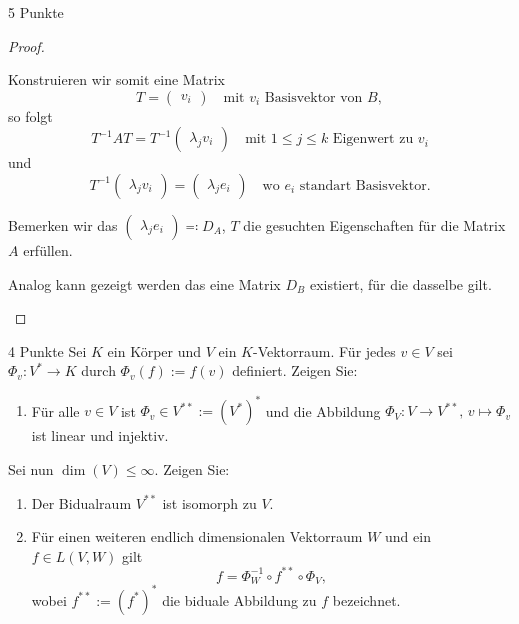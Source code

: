 \documentclass{problemset}
\begin{document}
\begin{problem}{5 Punkte}
\begin{proof}
\begin{enumerate}
              Konstruieren wir somit eine Matrix
              \begin{equation*}
                  T = \begin{pmatrix}
                      v_i
                  \end{pmatrix} \quad \text{mit } v_i \text{ Basisvektor von } B,
              \end{equation*} so folgt
              \begin{equation*}
                  T^{-1}AT = T^{-1} \begin{pmatrix}
                      \lambda_j v_i
                  \end{pmatrix} \quad \text{mit } 1 \le j \le k \text{ Eigenwert zu } v_i
              \end{equation*} und
              \begin{equation*}
                  T^{-1} \begin{pmatrix}
                      \lambda_j v_i
                  \end{pmatrix} = \begin{pmatrix}
                      \lambda_j e_i
                  \end{pmatrix} \quad \text{wo } e_i \text{ standart Basisvektor}.
              \end{equation*}

              Bemerken wir das \( \begin{pmatrix} \lambda_j e_i \end{pmatrix} \eqcolon D_A
              \), \(T\) die gesuchten Eigenschaften für die Matrix \(A\) erfüllen.

              Analog kann gezeigt werden das eine Matrix \(D_B\) existiert, für
              die dasselbe gilt.
    \end{enumerate}

\end{proof}
\end{problem}

\begin{problem}[Bidualraum]{4 Punkte}
Sei $K$ ein Körper und $V$ ein $K$-Vektorraum. Für jedes $v \in V$ sei $\Phi_v : V^* \to K$ durch $\Phi_v(f) := f(v)$ definiert. Zeigen Sie:
\begin{enumerate}
    \item Für alle $v \in V$ ist $\Phi_v \in V^{**} := (V^*)^*$ und die
          Abbildung $\Phi_V : V \to V^{**}, \, v \mapsto \Phi_v$ ist linear und
          injektiv.
\end{enumerate}
Sei nun $\dim(V) \leq \infty$. Zeigen Sie:
\begin{enumerate}[resume]
    \item Der Bidualraum $V^{**}$ ist isomorph zu $V$.
    \item Für einen weiteren endlich dimensionalen Vektorraum $W$ und ein $f
          \in L(V, W)$ gilt
          \[
              f = \Phi_W^{-1} \circ f^{**} \circ \Phi_V,
          \]
          wobei $f^{**} := (f^*)^*$ die biduale Abbildung zu $f$ bezeichnet.
\end{enumerate}
\end{problem}
\end{document}
